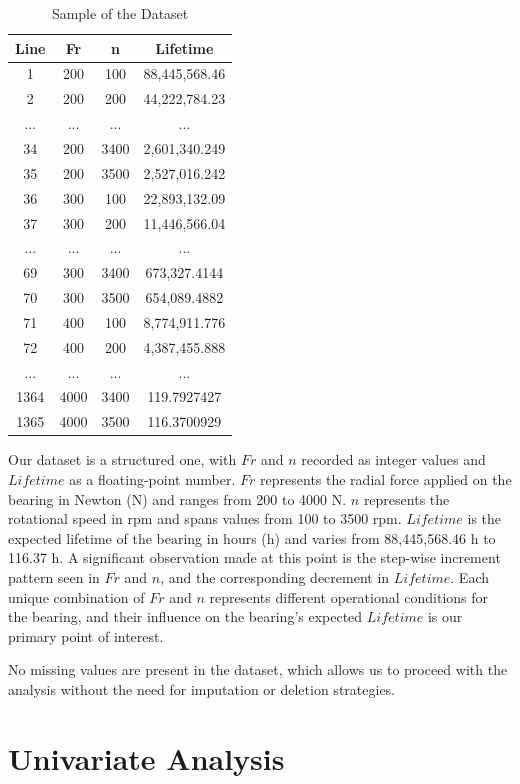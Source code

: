 \begin{table}[ht]
  \centering
  \caption{Sample of the Dataset}
  \label{table:bearings-dataset}
  \begin{tabular}{|c|c|c|c|}
  \hline
  Line & Fr & n & Lifetime \\
  \hline
  1 & 200 & 100 & 88,445,568.46 \\
  2 & 200 & 200 & 44,222,784.23 \\
  ... & ... & ... & ... \\
  34 & 200 & 3400 & 2,601,340.249 \\
  35 & 200 & 3500 & 2,527,016.242 \\
  36 & 300 & 100 & 22,893,132.09 \\
  37 & 300 & 200 & 11,446,566.04 \\
  ... & ... & ... & ... \\
  69 & 300 & 3400 & 673,327.4144 \\
  70 & 300 & 3500 & 654,089.4882 \\
  71 & 400 & 100 & 8,774,911.776 \\
  72 & 400 & 200 & 4,387,455.888 \\
  ... & ... & ... & ... \\
  1364 & 4000 & 3400 & 119.7927427 \\
  1365 & 4000 & 3500 & 116.3700929 \\
  \hline
  \end{tabular}
\end{table}

Our dataset is a structured one, with \(Fr\) and \(n\) recorded as integer values and \(Lifetime\) as a floating-point number. \(Fr\) represents the radial force applied on the bearing in Newton (N) and ranges from 200 to 4000 N. \(n\) represents the rotational speed in \ac{rpm} and spans values from 100 to 3500 rpm. \(Lifetime\) is the expected lifetime of the bearing in hours (h) and varies from 88,445,568.46 h to 116.37 h. A significant observation made at this point is the step-wise increment pattern seen in \(Fr\) and \(n\), and the corresponding decrement in \(Lifetime\). Each unique combination of \(Fr\) and \(n\) represents different operational conditions for the bearing, and their influence on the bearing's expected \(Lifetime\) is our primary point of interest.

No missing values are present in the dataset, which allows us to proceed with the analysis without the need for imputation or deletion strategies.


\section{Univariate Analysis}

